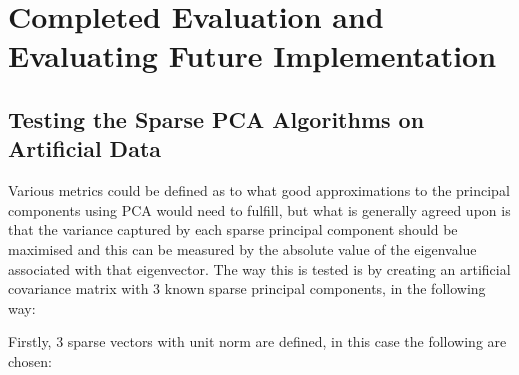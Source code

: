 \documentclass[11pt,a4paper]{article}
\begin{document}



 
\clearpage

\section{Completed Evaluation and Evaluating Future Implementation}
\subsection{Testing the Sparse PCA Algorithms on Artificial Data}
Various metrics could be defined as to what good approximations to the principal components using PCA would need to fulfill, but what is generally agreed upon is that the variance captured by each sparse principal component should be maximised and this can be measured by the absolute value of the eigenvalue associated with that eigenvector. The way this is tested is by creating an artificial covariance matrix with 3 known sparse principal components, in the following way:

Firstly, 3 sparse vectors with unit norm are defined, in this case the following are chosen:
\end{document}
